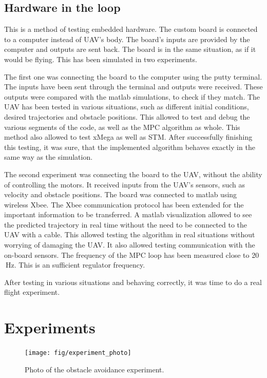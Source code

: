 \documentclass[a4paper,11pt,titlepage]{article}
\newcommand{\jed}[1]{\ensuremath{~\mathrm{#1}}}
\begin{document}
\subsection{Hardware in the loop}
This is a method of testing embedded hardware. The custom board is connected to a computer instead of UAV's body. The board's inputs are provided by the computer and outputs are sent back. The board is in the same situation, as if it would be flying.  This has been simulated in two experiments. 

The first one was connecting the board to the computer using the putty terminal. The inputs have been sent through the terminal and outputs were received. These outputs were compared with the matlab simulations, to check if they match. The UAV has been tested in various situations, such as different initial conditions, desired trajectories and obstacle positions. This allowed to test and debug the various segments of the code, as well as the MPC algorithm as whole. This method also allowed to test xMega as well as STM. After successfully finishing this testing, it was sure, that the implemented algorithm behaves exactly in the same way as the simulation.

The second experiment was connecting the board to the UAV, without the ability of controlling the motors. It received inputs from the UAV's sensors, such as velocity and obstacle positions. The board was connected to matlab using wireless Xbee. The Xbee communication protocol has been extended for the important information to be transferred. A matlab visualization allowed to see the predicted trajectory in real time without the need to be connected to the UAV with a cable. This allowed testing the algorithm in real situations without worrying of damaging the UAV. It also allowed testing communication with the on-board sensors. The frequency of the MPC loop has been measured close to 20\jed{Hz}. This is an sufficient regulator frequency.

After testing in various situations and behaving correctly, it was time to do a real flight experiment.

\section{Experiments}

\begin{figure}[h]
\centering
\texttt{[image: fig/experiment\_photo]}
\caption{Photo of the obstacle avoidance experiment.}
\label{fig:move_blocking}
\centering
\end{figure}
\end{document}
